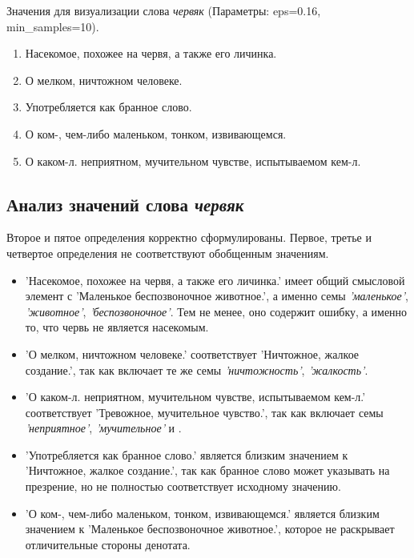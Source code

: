 Значения для визуализации слова \textit{червяк} (Параметры: eps=0.16, min\_samples=10).

\begin{enumerate}
    \item Насекомое, похожее на червя, а также его личинка.
    \item О мелком, ничтожном человеке.
    \item Употребляется как бранное слово.
    \item О ком-, чем-либо маленьком, тонком, извивающемся.
    \item О каком-л. неприятном, мучительном чувстве, испытываемом кем-л.
\end{enumerate}

\subsection*{Анализ значений слова \textit{червяк}}

Второе и пятое определения корректно сформулированы.
Первое, третье и четвертое определения не соответствуют обобщенным значениям.

\begin{itemize}
    \item ’Насекомое, похожее на червя, а также его личинка.’ имеет общий смысловой элемент с
’Маленькое беспозвоночное животное.’, а именно семы \textit{’маленькое’}, \textit{’животное’}, \textit{’беспозвоночное’}.
Тем не менее, оно содержит ошибку, а именно то, что червь не является насекомым.

    \item ’О мелком, ничтожном человеке.’ соответствует
’Ничтожное, жалкое создание.’, так как включает те же семы \textit{’ничтожность’}, \textit{’жалкость’}.

    \item ’О каком-л. неприятном, мучительном чувстве, испытываемом кем-л.’ соответствует
’Тревожное, мучительное чувство.’, так как включает семы \textit{’неприятное’}, \textit{’мучительное’} и
.
\end{itemize}

\begin{itemize}
    \item ’Употребляется как бранное слово.’ является близким значением к
’Ничтожное, жалкое создание.’, так как бранное слово может указывать на презрение,
но не полностью соответствует исходному значению.

    \item ’О ком-, чем-либо маленьком, тонком, извивающемся.’ является близким значением к
’Маленькое беспозвоночное животное.’, которое не раскрывает отличительные стороны денотата.
\end{itemize}

